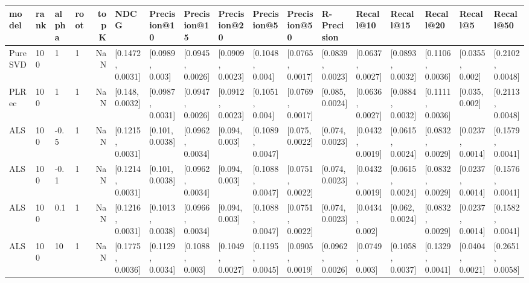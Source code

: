 \begin{tabular}{llllrllllllllllll}
\toprule
   model & rank & alpha & root &  topK &              NDCG &      Precision@10 &      Precision@15 &      Precision@20 &       Precision@5 &      Precision@50 &       R-Precision &         Recall@10 &         Recall@15 &         Recall@20 &          Recall@5 &         Recall@50 \\
\midrule
 PureSVD &  100 &     1 &    1 &   NaN &  [0.1472, 0.0031] &   [0.0989, 0.003] &  [0.0945, 0.0026] &  [0.0909, 0.0023] &   [0.1048, 0.004] &  [0.0765, 0.0017] &  [0.0839, 0.0023] &  [0.0637, 0.0027] &  [0.0893, 0.0032] &  [0.1106, 0.0036] &   [0.0355, 0.002] &  [0.2102, 0.0048] \\
   PLRec &  100 &     1 &    1 &   NaN &   [0.148, 0.0032] &  [0.0987, 0.0031] &  [0.0947, 0.0026] &  [0.0912, 0.0023] &   [0.1051, 0.004] &  [0.0769, 0.0017] &   [0.085, 0.0024] &  [0.0636, 0.0027] &  [0.0884, 0.0032] &  [0.1111, 0.0036] &    [0.035, 0.002] &  [0.2113, 0.0048] \\
     ALS &  100 &  -0.5 &    1 &   NaN &  [0.1215, 0.0031] &   [0.101, 0.0038] &  [0.0962, 0.0034] &    [0.094, 0.003] &  [0.1089, 0.0047] &   [0.075, 0.0022] &   [0.074, 0.0023] &  [0.0432, 0.0019] &  [0.0615, 0.0024] &  [0.0832, 0.0029] &  [0.0237, 0.0014] &  [0.1579, 0.0041] \\
     ALS &  100 &  -0.1 &    1 &   NaN &  [0.1214, 0.0031] &   [0.101, 0.0038] &  [0.0962, 0.0034] &    [0.094, 0.003] &  [0.1088, 0.0047] &  [0.0751, 0.0022] &   [0.074, 0.0023] &  [0.0432, 0.0019] &  [0.0615, 0.0024] &  [0.0832, 0.0029] &  [0.0237, 0.0014] &  [0.1576, 0.0041] \\
     ALS &  100 &   0.1 &    1 &   NaN &  [0.1216, 0.0031] &  [0.1013, 0.0038] &  [0.0966, 0.0034] &    [0.094, 0.003] &  [0.1088, 0.0047] &  [0.0751, 0.0022] &   [0.074, 0.0023] &   [0.0434, 0.002] &   [0.062, 0.0024] &  [0.0832, 0.0029] &  [0.0237, 0.0014] &  [0.1582, 0.0041] \\
     ALS &  100 &    10 &    1 &   NaN &  [0.1775, 0.0036] &  [0.1129, 0.0034] &   [0.1088, 0.003] &  [0.1049, 0.0027] &  [0.1195, 0.0045] &  [0.0905, 0.0019] &  [0.0962, 0.0026] &   [0.0749, 0.003] &  [0.1058, 0.0037] &  [0.1329, 0.0041] &  [0.0404, 0.0021] &  [0.2651, 0.0058] \\
\bottomrule
\end{tabular}
